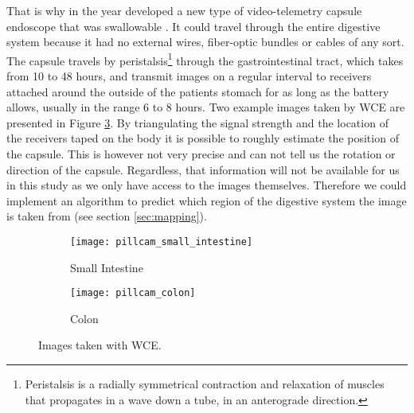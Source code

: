 \documentclass[thesis.tex]{subfiles}
\begin{document}
That is why in the year \citeyear{WirelessCapsule00} \citeauthor*{WirelessCapsule00} developed a new type of video-telemetry capsule endoscope that was swallowable \cite{WirelessCapsule00}. It could travel through the entire digestive system because it had no external wires, fiber-optic bundles or cables of any sort. The capsule travels by peristalsis\footnote{Peristalsis is a radially symmetrical contraction and relaxation of muscles that propagates in a wave down a tube, in an anterograde direction.} through the gastrointestinal tract, which takes from 10 to 48 hours, and transmit images on a regular interval to receivers attached around the outside of the patients stomach for as long as the battery allows, usually in the range 6 to 8 hours. Two example images taken by WCE are presented in Figure \ref{fig:pillcam_examples}. By triangulating the signal strength and the location of the receivers taped on the body it is possible to roughly estimate the position of the capsule. This is however not very precise and can not tell us the rotation or direction of the capsule. Regardless, that information will not be available for us in this study as we only have access to the images themselves. Therefore we could implement an algorithm to predict which region of the digestive system the image is taken from (see section \ref{sec:mapping}).

\begin{figure} %
  \centering
  \begin{subfigure}[b]{0.4\linewidth}%
    \centering
    \texttt{[image: pillcam\_small\_intestine]}%
    \caption{Small Intestine}%
    \label{fig:pillcam_small_intestine}%
  \end{subfigure}%
  \quad
  \begin{subfigure}[b]{0.4\linewidth}%
    \centering
    \texttt{[image: pillcam\_colon]}%
    \caption{Colon}%
    \label{fig:pillcam_colon}%
  \end{subfigure}%
  \caption[Images taken with WCE]{Images taken with WCE\footnotemark.}%
  \label{fig:pillcam_examples}%
\end{figure}%

\end{document}
